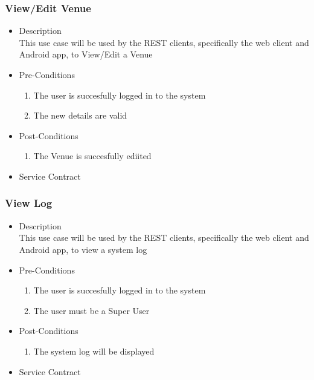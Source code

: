 \documentclass[a4paper,10pt]{article}
\begin{document}
\subsubsection{View/Edit Venue}
	\begin{itemize}
		\item Description\\
			This use case will be used by the REST clients, specifically the web client and Android app, to View/Edit a Venue
		\item Pre-Conditions
			\begin{enumerate}
				\item The user is succesfully logged in to the system
				\item The new details are valid
			\end{enumerate}
		\item Post-Conditions
			\begin{enumerate}
				\item The Venue is succesfully ediited
						
			\end{enumerate}
		\item Service Contract
	\end{itemize}


\subsubsection{View Log}
	\begin{itemize}
		\item Description\\
			This use case will be used by the REST clients, specifically the web client and Android app, to view a system log
		\item Pre-Conditions
			\begin{enumerate}
				\item The user is succesfully logged in to the system
				\item The user must be a Super User
			\end{enumerate}
		\item Post-Conditions
			\begin{enumerate}
				\item The system log will be displayed
				
						
			\end{enumerate}
		\item Service Contract
	\end{itemize}
\end{document}
